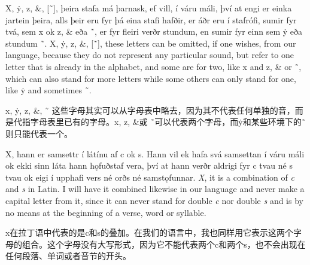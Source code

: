 \begin{paracol}{2}
    X, ẏ, z, \&, [˜], þeira stafa má þarnask, ef vill, í váru máli, því at engi er einka jartein þeira, alls þeir eru fyr þá eina stafi hafðir, er áðr eru í stafrófi, sumir fyr tvá, sem x ok z, \& eða ˜, er fyr fleiri verðr stundum, en sumir fyr einn sem ẏ eða stundum ˜.
    \switchcolumn
    X, ẏ, z, \&, [˜], these letters can be omitted, if one wishes, from our language, because they do not represent any particular sound, but refer to one letter that is already in the alphabet, and some are for two, like x and z, \& or ˜, which can also stand for more letters while some others can only stand for one, like ẏ and sometimes ˜.
\end{paracol}
\begin{translation*}{}
    x, ẏ, z, \&, ˜ 这些字母其实可以从字母表中略去，因为其不代表任何单独的音，而是代指字母表里已有的字母。x, z, \&或 ˜可以代表两个字母，而ẏ和某些环境下的˜则只能代表一个。
\end{translation*}
\begin{paracol}{2}
    X, hann er samsettr í látínu af c ok s. Hann vil ek hafa svá samsettan í váru máli ok ekki sinn láta hann hǫfuðstaf vera, því at hann verðr aldrigi fyr c tvau né s tvau ok eigi í upphafi vers né orðs né samstǫfunnar.
    \switchcolumn
    \textit{X}, it is a combination of \textit{c} and \textit{s} in Latin. I will have it combined likewise in our language and never make a capital letter from it, since it can never stand for double \textit{c} nor double \textit{s} and is by no means at the beginning of a verse, word or syllable.
\end{paracol}
\begin{translation*}{}
    x在拉丁语中代表的是c和s的叠加。在我们的语言中，我也同样用它表示这两个字母的组合。这个字母没有大写形式，因为它不能代表两个c和两个s，也不会出现在任何段落、单词或者音节的开头。
\end{translation*}

